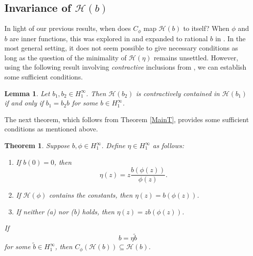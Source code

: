\documentclass[11pt]{amsart}
\def\HH{{\mathcal H}}
\def\bbD{\mathbb{D}}
\renewcommand{\geq}{\geqslant}
\renewcommand{\subset}{\subseteq}
\numberwithin{equation}{section}
\theoremstyle{plain}
\newtheorem{theorem}[equation]{Theorem}
\newtheorem{lemma}[equation]{Lemma}
\theoremstyle{definition}
\newtheorem{example}[equation]{Example}
\begin{document}
\subsection*{Invariance of $\HH(b)$}
In light of our previous results, when does $C_{\phi}$ map $\HH(b)$ to itself? When $\phi$ and $b$ are inner functions, this was explored in \cite[Theorem 4.1]{MR3176147} and expanded to rational $b$ in \cite{MR4653340}. In the most general setting,  it does not seem possible to give necessary conditions as long as the question of the minimality of $\HH(\eta)$ remains unsettled. However, using the following result involving {\em contractive} inclusions from \cite[Thm.~27.12]{Hb2-book}, we can establish some sufficient conditions. 

\begin{lemma}\label{le:FM th 27.12}
	Let $ b_1, b_2  \in H^{\infty}_{1}$. Then $ \HH(b_2) $ is contractively contained in $  \HH(b_1) $ if and only if $ b_1=b_2b $ for some $ b \in H^{\infty}_{1}$.
\end{lemma}

 The next theorem, which follows from Theorem \ref{MainT}, provides some sufficient conditions as mentioned above. 

\begin{theorem}\label{th:invariance}
	Suppose $ b, \phi  \in H^{\infty}_1$. Define $ \eta  \in H^{\infty}_{1}$ as follows:
	\begin{enumerate}
		\item  If $ b(0)=0 $, then $$ \eta(z)=z\frac{b(\phi(z))}{\phi(z)}.$$
		
		\item If $ \HH(\phi) $ contains the constants, then $ \eta(z)=b(\phi(z)) $.
		
		\item If neither (a) nor (b) holds, then $ \eta(z)=zb(\phi(z)) $.
		
	\end{enumerate}
If 
\begin{equation}\label{eq:quasikonig}
 b=\eta \widetilde{b}
\end{equation}
for some $\widetilde{b} \in H^{\infty}_{1}$, then $ C_\phi(\HH(b))\subset \HH(b) $.


\end{theorem}






\end{document}
